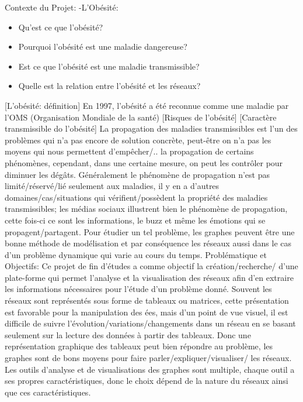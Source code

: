 Contexte du Projet:
\newline
-L'Ob\'esit\'e:
\begin{itemize}
\item{Qu'est ce que l'ob\'esit\'e?}
\item{Pourquoi l'obésité est une maladie dangereuse?}
\item{Est ce que l'ob\'esit\'e est une maladie transmissible?}
\item{Quelle est la relation entre l'ob\'esit\'e et les r\'eseaux?}
\end{itemize}
[L'ob\'esit\'e: d\'efinition]
En 1997, l'ob\'esit\'e a \'et\'e reconnue comme une maladie par l'OMS (Organisation Mondiale de la sant\'e)
[Risques de l'ob\'esit\'e]
[Caractère transmissible do l'ob\'esit\'e]
La propagation des maladies transmissibles est l'un des probl\`emes qui n'a pas encore de solution concrète, peut-\^etre on n'a pas les moyens qui nous permettent d'emp\^echer/.. la propagation de certains ph\'enom\`enes, cependant, dans une certaine mesure, on peut les contr\^oler pour diminuer les d\'eg\^ats. G\'en\'eralement le ph\'enom\`ene de propagation n'est pas limit\'e/r\'eserv\'e/li\'e seulement aux maladies, il y en a d'autres domaines/cas/situations qui v\'erifient/poss\`edent la propri\'et\'e des maladies transmissibles; les m\'edias sociaux illustrent bien le ph\'enom\`ene de propagation, cette fois-ci ce sont les informations, le buzz et m\^eme les \'emotions qui se propagent/partagent. Pour \'etudier un tel probl\`eme, les graphes peuvent \^etre une bonne m\'ethode de mod\'elisation et par cons\'equence les r\'eseaux aussi dans le cas d'un probl\`eme dynamique qui varie au cours du temps.
\newline
Probl\'ematique et Objectifs:
\newline
Ce projet de fin d'\'etudes a comme objectif la cr\'eation/recherche/ d'une plate-forme qui permet l'analyse et la visualisation des r\'eseaux afin d'en extraire les informations n\'ecessaires pour l'\'etude d'un probl\`eme donn\'e. Souvent les r\'eseaux sont repr\'esent\'es sous forme de tableaux ou matrices, cette pr\'esentation est favorable pour la manipulation des \'ees, mais d'un point de vue visuel, il est difficile de suivre l'\'evolution/variations/changements dans un r\'eseau en se basant seulement sur la lecture des donn\'ees \`a partir des tableaux. Donc une repr\'esentation graphique des tableaux peut bien r\'epondre au probl\`eme, les graphes sont de bons moyens  pour faire parler/expliquer/visualiser/ les r\'eseaux. Les outils d'analyse et de visualisations des graphes sont multiple, chaque outil a ses propres caract\'eristiques, donc le choix d\'epend de la nature du r\'eseaux ainsi que ces caract\'eristiques. 
